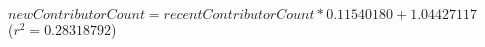 $\mathit{newContributorCount} = \mathit{recentContributorCount} * 0.11540180 + 1.04427117$\\($r^2 = 0.28318792$)
